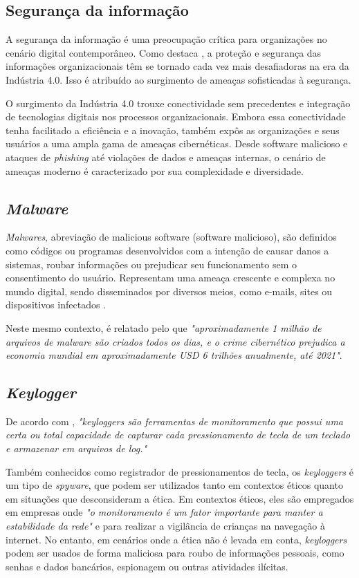 \documentclass[12pt]{article}
\begin{document}
\subsection{Segurança da informação}
A segurança da informação é uma preocupação crítica para organizações no cenário digital contemporâneo. Como destaca \citep{bhaharin2019issues} , a proteção e segurança das informações organizacionais têm se tornado cada vez mais desafiadoras na era da Indústria 4.0. Isso é atribuído ao surgimento de ameaças sofisticadas à segurança.

O surgimento da Indústria 4.0 trouxe conectividade sem precedentes e integração de tecnologias digitais nos processos organizacionais. Embora essa conectividade tenha facilitado a eficiência e a inovação, também expôs as organizações e seus usuários a uma ampla gama de ameaças cibernéticas. Desde software malicioso e ataques de \textit{phishing} até violações de dados e ameaças internas, o cenário de ameaças moderno é caracterizado por sua complexidade e diversidade.
\subsection{\textit{Malware}}
\textit{Malwares}, abreviação de malicious software (software malicioso), são definidos como códigos ou programas desenvolvidos com a intenção de causar danos a sistemas, roubar informações ou prejudicar seu funcionamento sem o consentimento do usuário. Representam uma ameaça crescente e complexa no mundo digital, sendo disseminados por diversos meios, como e-mails, sites ou dispositivos infectados \citep{singh2021keylogger}.

Neste mesmo contexto, é relatado pelo \citep{singh2018infringement} que \textit{"aproximadamente 1 milhão de arquivos de \textit{malware} são criados todos os dias, e o crime cibernético prejudica a economia mundial em aproximadamente USD 6 trilhões anualmente, até 2021"}.
\subsection{\textit{Keylogger}}
De acordo com \citep{wajahat2019novel}, \textit{"\textit{keyloggers} são ferramentas de monitoramento que possui uma certa ou total capacidade de capturar cada pressionamento de tecla de um teclado e armazenar em arquivos de log."}

Também conhecidos como registrador de pressionamentos de tecla, os \textit{keyloggers} é um tipo de \textit{spyware}, que podem ser utilizados tanto em contextos éticos quanto em situações que desconsideram a ética. Em contextos éticos, eles são empregados em empresas onde \textit{"o monitoramento é um fator importante para manter a estabilidade da rede"} \citep{tuli2013system} e para realizar a vigilância de crianças na navegação à internet. No entanto, em cenários onde a ética não é levada em conta, \textit{keyloggers} podem ser usados de forma maliciosa para roubo de informações pessoais, como senhas e dados bancários, espionagem ou outras atividades ilícitas.
\end{document}
